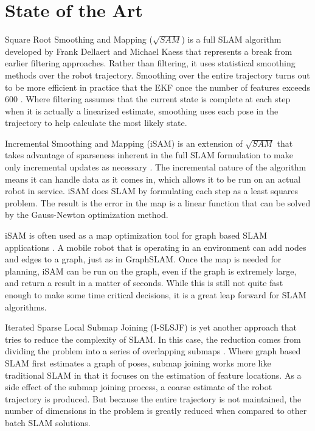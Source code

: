 \section{State of the Art}

Square Root Smoothing and Mapping ($\sqrt{SAM}$) is a full SLAM algorithm developed by Frank Dellaert and Michael Kaess that represents a break from earlier filtering approaches. Rather than filtering, it uses statistical smoothing methods over the robot trajectory.  Smoothing over the entire trajectory turns out to be more efficient in practice that the EKF once the number of features exceeds 600 \cite{Dellaert06ijrr}.  Where filtering assumes that the current state is complete at each step when it is actually a linearized estimate, smoothing uses each pose in the trajectory to help calculate the most likely state.

Incremental Smoothing and Mapping (iSAM) is an extension of $\sqrt{SAM}$ that takes advantage of sparseness inherent in the full SLAM formulation to make only incremental updates as necessary \cite{Kaess08tro}. The incremental nature of the algorithm means it can handle data as it comes in, which allows it to be run on an actual robot in service.  iSAM does SLAM by formulating each step as a least squares problem.  The result is the error in the map is a linear function that can be solved by the Gauss-Newton optimization method.

iSAM is often used as a map optimization tool for graph based SLAM applications \cite{Sunderhauf}.  A mobile robot that is operating in an environment can add nodes and edges to a graph, just as in GraphSLAM.  Once the map is needed for planning, iSAM can be run on the graph, even if the graph is extremely large, and return a result in a matter of seconds.  While this is still not quite fast enough to make some time critical decisions, it is a great leap forward for SLAM algorithms.

Iterated Sparse Local Submap Joining (I-SLSJF) is yet another approach that tries to reduce the complexity of SLAM.  In this case, the reduction comes from dividing the problem into a series of overlapping submaps  \cite{huang2008iterated}.  Where graph based SLAM first estimates a graph of poses, submap joining works more like traditional SLAM in that it focuses on the estimation of feature locations.  As a side effect of the submap joining process, a coarse estimate of the robot trajectory is produced.  But because the entire trajectory is not maintained, the number of dimensions in the problem is greatly reduced when compared to other batch SLAM solutions.

